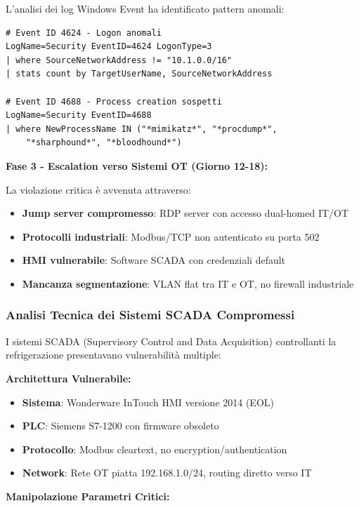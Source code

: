 L'analisi dei log Windows Event ha identificato pattern anomali:
\begin{lstlisting}[caption={Indicatori di Movimento Laterale},label={lst:lateral_movement}]
# Event ID 4624 - Logon anomali
LogName=Security EventID=4624 LogonType=3
| where SourceNetworkAddress != "10.1.0.0/16"
| stats count by TargetUserName, SourceNetworkAddress

# Event ID 4688 - Process creation sospetti
LogName=Security EventID=4688
| where NewProcessName IN ("*mimikatz*", "*procdump*", 
    "*sharphound*", "*bloodhound*")
\end{lstlisting}

\textbf{Fase 3 - Escalation verso Sistemi OT (Giorno 12-18):}

La violazione critica è avvenuta attraverso:
\begin{itemize}
    \item \textbf{Jump server compromesso}: RDP server con accesso dual-homed IT/OT
    \item \textbf{Protocolli industriali}: Modbus/TCP non autenticato su porta 502
    \item \textbf{HMI vulnerabile}: Software SCADA con credenziali default
    \item \textbf{Mancanza segmentazione}: VLAN flat tra IT e OT, no firewall industriale
\end{itemize}

\subsubsection{Analisi Tecnica dei Sistemi SCADA Compromessi}

I sistemi SCADA (Supervisory Control and Data Acquisition) controllanti la refrigerazione presentavano vulnerabilità multiple:

\textbf{Architettura Vulnerabile:}
\begin{itemize}
    \item \textbf{Sistema}: Wonderware InTouch HMI versione 2014 (EOL)
    \item \textbf{PLC}: Siemens S7-1200 con firmware obsoleto
    \item \textbf{Protocollo}: Modbus cleartext, no encryption/authentication
    \item \textbf{Network}: Rete OT piatta 192.168.1.0/24, routing diretto verso IT
\end{itemize}

\textbf{Manipolazione Parametri Critici:}


